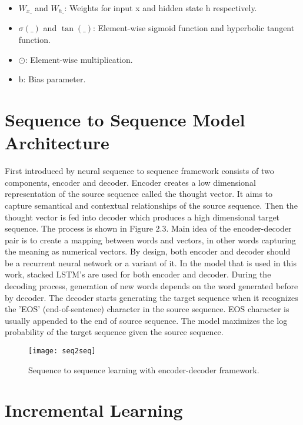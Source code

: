 \begin{itemize}

\item $W_{x\_}$ and $W_{h\_}$: Weights for input x and hidden state h respectively.

\item $\sigma(\_)$ and $\tan(\_)$: Element-wise sigmoid function and hyperbolic tangent function.

\item $\odot$: Element-wise multiplication.

\item b: Bias parameter.

\end{itemize}

\section{Sequence to Sequence Model Architecture}

First introduced by \cite{Vinyalsetal} neural sequence to sequence framework consists of two components, encoder and decoder. Encoder creates a low dimensional representation of the source sequence called the thought vector. It aims to capture semantical and contextual relationships of the source sequence. Then the thought vector is fed into decoder which produces a high dimensional target sequence. The process is shown in Figure 2.3. Main idea of the encoder-decoder pair is to create a mapping between words and vectors, in other words capturing the meaning as numerical vectors. By design, both encoder and decoder should be a recurrent neural network or a variant of it. In the model that is used in this work, stacked LSTM's are used for both encoder and decoder. During the decoding process, generation of new words depends on the word generated before by decoder. The decoder starts generating the target sequence when it recognizes the 'EOS' (end-of-sentence) character in the source sequence. EOS character is usually appended to the end of source sequence. The model maximizes the log probability of the target sequence given the source sequence.

\begin{figure}[t]
\texttt{[image: seq2seq]}
\centering
\caption{Sequence to sequence learning with encoder-decoder framework.}
\end{figure}

\section{Incremental Learning}

